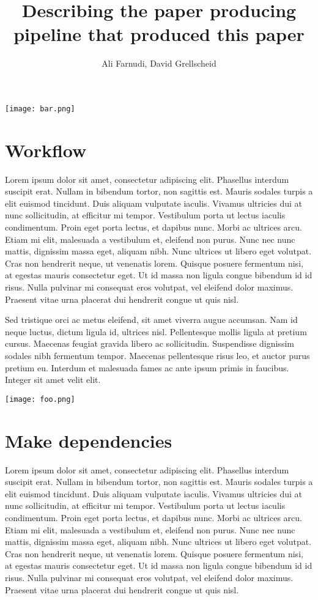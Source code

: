 \documentclass[a4paper,12pt]{article}
\title{Describing the paper producing pipeline that produced this paper}
\author{Ali Farnudi, David Grellscheid}
\begin{document}
\maketitle

\begin{center}
        \texttt{[image: bar.png]}
\end{center}
\section{Workflow}
Lorem ipsum dolor sit amet, consectetur adipiscing elit. Phasellus interdum suscipit erat. Nullam in bibendum tortor, non sagittis est. Mauris sodales turpis a elit euismod tincidunt. Duis aliquam vulputate iaculis. Vivamus ultricies dui at nunc sollicitudin, at efficitur mi tempor. Vestibulum porta ut lectus iaculis condimentum. Proin eget porta lectus, et dapibus nunc. Morbi ac ultrices arcu. Etiam mi elit, malesuada a vestibulum et, eleifend non purus. Nunc nec nunc mattis, dignissim massa eget, aliquam nibh. Nunc ultrices ut libero eget volutpat. Cras non hendrerit neque, ut venenatis lorem. Quisque posuere fermentum nisi, at egestas mauris consectetur eget. Ut id massa non ligula congue bibendum id id risus. Nulla pulvinar mi consequat eros volutpat, vel eleifend dolor maximus. Praesent vitae urna placerat dui hendrerit congue ut quis nisl.

Sed tristique orci ac metus eleifend, sit amet viverra augue accumsan. Nam id neque luctus, dictum ligula id, ultrices nisl. Pellentesque mollis ligula at pretium cursus. Maecenas feugiat gravida libero ac sollicitudin. Suspendisse dignissim sodales nibh fermentum tempor. Maecenas pellentesque risus leo, et auctor purus pretium eu. Interdum et malesuada fames ac ante ipsum primis in faucibus. Integer sit amet velit elit.

\begin{center}
	\texttt{[image: foo.png]}
\end{center}


\section{Make dependencies}
Lorem ipsum dolor sit amet, consectetur adipiscing elit. Phasellus interdum suscipit erat. Nullam in bibendum tortor, non sagittis est. Mauris sodales turpis a elit euismod tincidunt. Duis aliquam vulputate iaculis. Vivamus ultricies dui at nunc sollicitudin, at efficitur mi tempor. Vestibulum porta ut lectus iaculis condimentum. Proin eget porta lectus, et dapibus nunc. Morbi ac ultrices arcu. Etiam mi elit, malesuada a vestibulum et, eleifend non purus. Nunc nec nunc mattis, dignissim massa eget, aliquam nibh. Nunc ultrices ut libero eget volutpat. Cras non hendrerit neque, ut venenatis lorem. Quisque posuere fermentum nisi, at egestas mauris consectetur eget. Ut id massa non ligula congue bibendum id id risus. Nulla pulvinar mi consequat eros volutpat, vel eleifend dolor maximus. Praesent vitae urna placerat dui hendrerit congue ut quis nisl.
\end{document}
